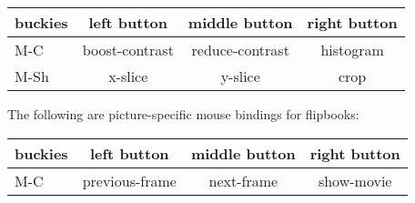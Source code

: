 \begin{tabular}{|l|ccc|}
\hline
buckies & left button       & middle button  & right  button       \\
\hline
M-C	& boost-contrast  & reduce-contrast  & histogram    \\
M-Sh	& x-slice           & y-slice        & crop           \\
\hline
\end{tabular}

The following are picture-specific mouse bindings for flipbooks:

\begin{tabular}{|l|ccc|}
\hline
buckies & left button       & middle button  & right  button       \\
\hline
M-C	& previous-frame  & next-frame  & show-movie    \\
\hline
\end{tabular}


